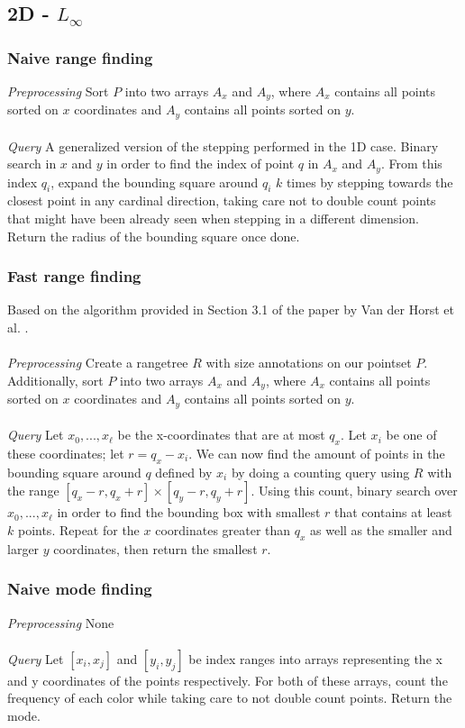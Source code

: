 \documentclass{article}
\newcommand{\fb}[1]{{\color{blue}#1}}
\begin{document}
\subsection{2D - $L_\infty$}
\subsubsection{Naive range finding}
\textit{Preprocessing} Sort $P$ into two arrays $A_x$ and $A_y$, where $A_x$ contains all points sorted on $x$ coordinates and $A_y$ contains all points sorted on $y$. \\\\
\textit{Query} A generalized version of the stepping performed in the 1D case. Binary search in $x$ and $y$ in order to find the index of point $q$ in $A_x$ and $A_y$. From this index $q_i$, expand the bounding square around $q_i$ $k$ times by stepping towards the closest point in any cardinal direction, taking care not to double count points that might have been already seen when stepping in a different dimension. Return the radius of the bounding square once done.
\subsubsection{Fast range finding}
Based on the algorithm provided in Section 3.1 of the paper by Van der Horst et
al. \cite{vanderhorst_et_al:LIPIcs.ESA.2022.67}.\\\\ \textit{Preprocessing}
Create a rangetree $R$ \fb{with size annotations} on our pointset $P$. Additionally, sort $P$ into two
arrays $A_x$ and $A_y$, where $A_x$ contains all points sorted on $x$
coordinates and $A_y$ contains all points sorted on $y$. \\\\ \textit{Query}
Let $x_0, ..., x_\ell$ be the x-coordinates that are at most $q_x$. Let $x_i$
be one of these coordinates; let $r = q_x - x_i$. We can now find the amount of
points in the bounding square around $q$ defined by $x_i$ by doing a counting
query using $R$ with the range $[q_x - r, q_x + r] \times [q_y - r, q_y + r]$.
Using this count, binary search over $x_0, ..., x_\ell$ in order to find the
bounding box with smallest $r$ that contains at least $k$ points. Repeat for
the $x$ coordinates greater than $q_x$ as well as the smaller and larger $y$
coordinates, then return the smallest $r$.
\subsubsection{Naive mode finding}
\textit{Preprocessing} None \\\\
\textit{Query} Let $[x_i, x_j]$ and $[y_i, y_j]$ be index ranges into arrays representing the x and y coordinates of the points respectively. For both of these arrays, count the frequency of each color while taking care to not double count points. Return the mode.
\end{document}
